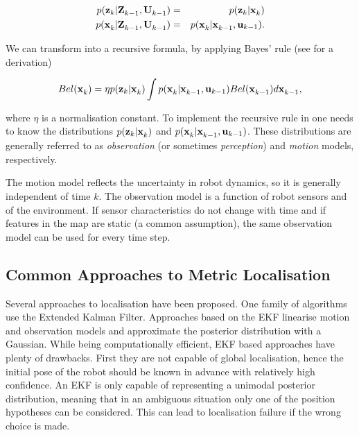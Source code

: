 \begin{eqnarray}
 p(\z{k} | \Zall{k-1}{}, \Uall{k-1}{})    &=& p(\z{k} | \x{k}{}{}) \\
 p(\x{k}{}{} | \Zall{k-1}{}, \Uall{k-1}{})&=& p(\x{k}{}{} | \x{k-1}{}{}, \U{k-1}{}).
\end{eqnarray}

We can transform  into a recursive
formula, by applying Bayes' rule (see \cite{Thrun00j} for a derivation)

\begin{equation}
Bel(\x{k}{}{}) = \eta p(\z{k} | \x{k}{}{}) \int 
                     p(\x{k}{}{} | \x{k-1}{}{}, \U{k-1}{}) 
                     Bel(\x{k-1}{}{}) d \x{k-1}{}{},
\label{eqn:localise_recursion}
\end{equation}

where $\eta$ is a normalisation constant. To implement the recursive
rule in  one needs to know the
distributions $p(\z{k} | \x{k}{}{})$ and $p(\x{k}{}{} | \x{k-1}{}{},
\U{k-1}{})$. These distributions are generally referred to as {\it
observation} (or sometimes {\it perception}) and {\it motion} models,
respectively. 

The motion model reflects the uncertainty in robot dynamics, so it is
generally independent of time $k$. The observation model is a function
of robot sensors and of the environment. If sensor characteristics do
not change with time and if features in the map are static (a common
assumption), the same observation model can be used for every time
step.

\subsection{Common Approaches to Metric Localisation}

Several approaches to localisation have been proposed. One family of
algorithms use the Extended Kalman Filter\cite{Jensfelt99}. Approaches
based on the EKF linearise motion and observation models and
approximate the posterior distribution with a Gaussian. While being
computationally efficient, EKF based approaches have plenty of
drawbacks. First they are not capable of global localisation, hence
the initial pose of the robot should be known in advance with
relatively high confidence. An EKF is only capable of representing a
unimodal posterior distribution, meaning that in an ambiguous
situation only one of the position hypotheses can be considered. This
can lead to localisation failure if the wrong choice is made.

